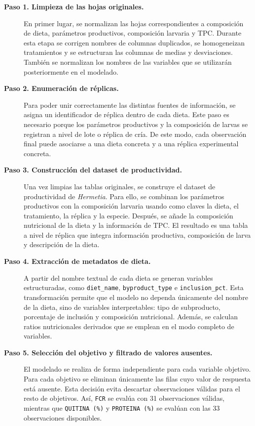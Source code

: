 \begin{description}
    \item[\textbf{Paso 1. Limpieza de las hojas originales.}]
    En primer lugar, se normalizan las hojas correspondientes a composición de dieta, parámetros productivos, composición larvaria y TPC. Durante esta etapa se corrigen nombres de columnas duplicados, se homogeneizan tratamientos y se estructuran las columnas de medias y desviaciones. También se normalizan los nombres de las variables que se utilizarán posteriormente en el modelado.

    \item[\textbf{Paso 2. Enumeración de réplicas.}]
    Para poder unir correctamente las distintas fuentes de información, se asigna un identificador de réplica dentro de cada dieta. Este paso es necesario porque los parámetros productivos y la composición de larvas se registran a nivel de lote o réplica de cría. De este modo, cada observación final puede asociarse a una dieta concreta y a una réplica experimental concreta.

    \item[\textbf{Paso 3. Construcción del dataset de productividad.}]
    Una vez limpias las tablas originales, se construye el dataset de productividad de \textit{Hermetia}. Para ello, se combinan los parámetros productivos con la composición larvaria usando como claves la dieta, el tratamiento, la réplica y la especie. Después, se añade la composición nutricional de la dieta y la información de TPC. El resultado es una tabla a nivel de réplica que integra información productiva, composición de larva y descripción de la dieta.

    \item[\textbf{Paso 4. Extracción de metadatos de dieta.}]
    A partir del nombre textual de cada dieta se generan variables estructuradas, como \texttt{diet\_name}, \texttt{byproduct\_type} e \texttt{inclusion\_pct}. Esta transformación permite que el modelo no dependa únicamente del nombre de la dieta, sino de variables interpretables: tipo de subproducto, porcentaje de inclusión y composición nutricional. Además, se calculan ratios nutricionales derivados que se emplean en el modo completo de variables.

    \item[\textbf{Paso 5. Selección del objetivo y filtrado de valores ausentes.}]
    El modelado se realiza de forma independiente para cada variable objetivo. Para cada objetivo se eliminan únicamente las filas cuyo valor de respuesta está ausente. Esta decisión evita descartar observaciones válidas para el resto de objetivos. Así, \texttt{FCR} se evalúa con 31 observaciones válidas, mientras que \texttt{QUITINA (\%)} y \texttt{PROTEINA (\%)} se evalúan con las 33 observaciones disponibles.


\end{description}

